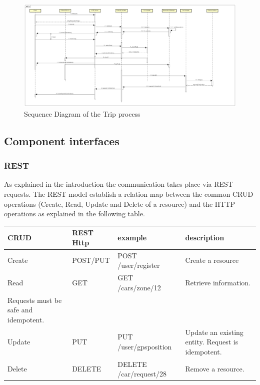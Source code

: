 \begin{figure}[H]	
	\centering
	\includegraphics[width=\textwidth]{img/sequence_trip}
	\caption{Sequence Diagram of the Trip process}
\end{figure}
\newpage



\subsection{Component interfaces} 
\subsubsection{REST}
As explained in the introduction the communication takes place via REST requests. The REST model establish a relation map between the common CRUD operations (Create, Read, Update and Delete of a resource) and the HTTP operations as explained in the following table.

\begin{center}
	\begin{adjustbox}{max width=\textwidth}	
		\begin{tabular}{|l|>{\raggedright}p{2.5cm}|>{\raggedright}p{4.5cm}|>{\raggedright}p{5cm}|}
			\hline 
			CRUD & REST Http & example &description\tabularnewline
			\hline 
			Create & POST/PUT & POST /user/register  & Create a resource \tabularnewline
			\hline 
			Read & GET & GET /cars/zone/12 & Retrieve information. \\  Requests must be safe and idempotent.\tabularnewline
			\hline 
			Update & PUT & PUT /user/gpsposition & Update an existing entity. Request is idempotent. \tabularnewline
			\hline 
			Delete & DELETE & DELETE /car/request/28 & Remove a resource.\tabularnewline
			\hline 
		\end{tabular}
	\end{adjustbox}	
	\par\end{center}

